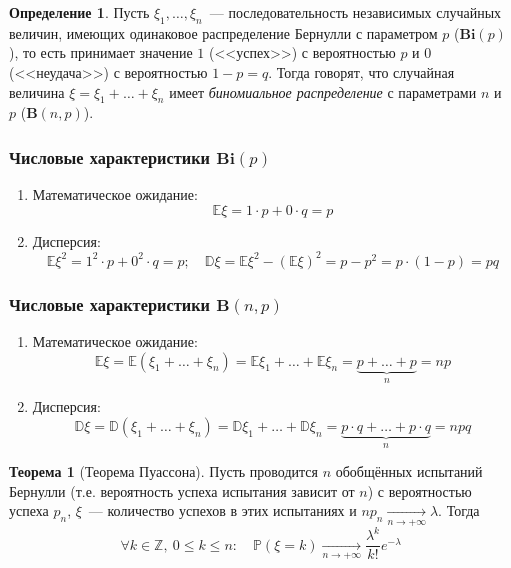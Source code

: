 \documentclass[oneside,final,14pt]{extreport}
\theoremstyle{plain}
\theoremstyle{definition}
\newtheorem*{defn}{Определение}
\theoremstyle{named}
\newtheorem*{namedthm}{Теорема}
\begin{document}
\begin{defn}
    Пусть $\xi_1, \ldots, \xi_n$~--- последовательность независимых случайных величин, имеющих одинаковое распределение Бернулли с параметром $p$ ($\mathbf{Bi}(p)$), то есть принимает значение $1$ (<<успех>>) с вероятностью $p$ и $0$ (<<неудача>>) с вероятностью $1 - p = q$. Тогда говорят, что случайная величина $\xi = \xi_1 + \ldots + \xi_n$ имеет {\it биномиальное распределение} с параметрами $n$ и $p$ ($\mathbf{B}(n, p)$).
\end{defn}

\subsubsection{Числовые характеристики $\mathbf{Bi}(p)$}
\begin{enumerate}
    \item Математическое ожидание:
    \begin{equation*}
        \mathbb{E}\xi =  1 \cdot p + 0 \cdot q = p
    \end{equation*}
    \item Дисперсия:
        $$\mathbb{E}\xi^2 = 1^2 \cdot p + 0^2 \cdot q = p; \quad \mathbb{D}\xi = \mathbb{E}\xi^2 - (\mathbb{E}\xi)^2 = p - p^2 = p \cdot (1 - p) = pq$$
\end{enumerate}

\subsubsection{Числовые характеристики $\mathbf{B}(n, p)$}
\begin{enumerate}
    \item Математическое ожидание:
    \begin{equation*}
        \mathbb{E}\xi = \mathbb{E}(\xi_1 + \ldots + \xi_n) = \mathbb{E}\xi_1 + \ldots + \mathbb{E}\xi_n = \underbrace{p + \ldots + p}_{n} = np
    \end{equation*}
    \item Дисперсия:
    \begin{equation*}
        \mathbb{D}\xi = \mathbb{D}(\xi_1 + \ldots + \xi_n) = \mathbb{D}\xi_1 + \ldots + \mathbb{D}\xi_n = \underbrace{p \cdot q + \ldots + p \cdot q}_{n} = npq
    \end{equation*}
\end{enumerate}

\begin{namedthm}[Теорема Пуассона]
    Пусть проводится $n$ обобщённых испытаний Бернулли (т.е. вероятность успеха испытания зависит от $n$) с вероятностью успеха $p_n$, $\xi$~--- количество успехов в этих испытаниях и $n p_{n} \underset{n \to +\infty}{\longrightarrow} \lambda$. Тогда
    \begin{equation*}
        \forall k \in \mathbb{Z},~ 0 \leqslant k \leqslant n: \quad \mathbb{P}\left(\xi=k\right) \underset{n \to +\infty}{\longrightarrow} \frac{\lambda^{k}}{k !} e^{-\lambda}
    \end{equation*}
\end{namedthm}
\end{document}
